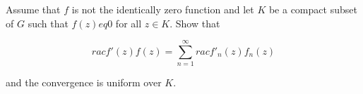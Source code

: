 
Assume that $f$ is not the identically zero function and let $K$ be a compact subset of $G$ such that $f(z) 
eq 0$ for all $z \in K$. Show that

$$rac{f'(z)}{f(z)} = \sum_{n=1}^{\infty} rac{f'_n(z)}{f_n(z)}$$

and the convergence is uniform over $K$.
